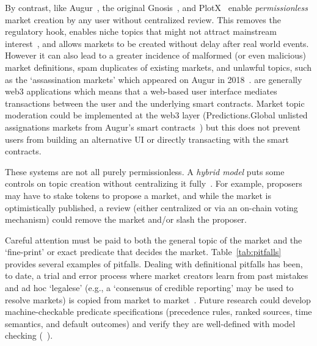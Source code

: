 By contrast, \depms like Augur~\cite{AKPWZ15,AKPWZ19}, the original Gnosis~\cite{Gn17}, and PlotX~\cite{plotx_docs} enable \textit{permissionless} market creation by any user without centralized review. This removes the regulatory hook, enables niche topics that might not attract mainstream interest~\cite{WZ24}, and allows markets to be created without delay after real world events. However it can also lead to a greater incidence of malformed (or even malicious) market definitions, spam duplicates of existing markets, and unlawful topics, such as the `assassination markets' which appeared on Augur in 2018~\cite{Du19}. \depms are generally web3 applications which means that a web-based user interface mediates transactions between the user and the underlying smart contracts. Market topic moderation could be implemented at the web3 layer (\eg Predictions.Global unlisted assignations markets from Augur's smart contracts~\cite{Du19}) but this does not prevent users from building an alternative UI or directly transacting with the smart contracts. 


These systems are not all purely permissionless. A \textit{hybrid model} puts some controls on topic creation without centralizing it fully~\cite{AKPWZ19}. For example, proposers may have to stake tokens to propose a market, and while the market is optimistically published, a review (either centralized or via an on-chain voting mechanism) could remove the market and/or slash the proposer.  

Careful attention must be paid to both the general topic of the market and the `fine-print' or exact predicate that decides the market. Table~\ref{tab:pitfalls} provides several examples of pitfalls. Dealing with definitional pitfalls has been, to date, a trial and error process where market creators learn from past mistakes and ad hoc `legalese' (e.g., a `consensus of credible reporting' may be used to resolve markets) is copied from market to market~\cite{Ad24}. Future research could develop machine-checkable predicate specifications (precedence rules, ranked sources, time semantics, and default outcomes) and verify they are well-defined with model checking (\cf~\cite{Cla21}). 

